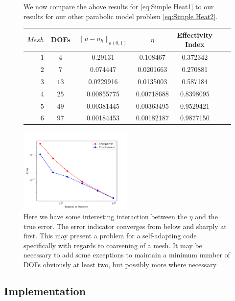 \documentclass{uonmathreport}
\theoremstyle{definition}
\theoremstyle{problem}
\theoremstyle{theorem}
\begin{document}
\begin{figure}[h]
We now compare the above results for \ref{eq:Simple Heat1} to our results for our other parabolic model problem \ref{eq:Simple Heat2}. 
\begin{center}
  \begin{tabular}{r|cccccc}  \label{table:IndicatorPDE2}
    $Mesh$   & DOFs & $\|u-u_h\|_{a(0,1)}$ & $\eta$ & Effectivity Index  \\ \hline
    $1$ & $4$ & 0.29131 &  0.108467  & 0.372342 \\
    $2$ & $7$ & 0.074447 &  0.0201663  &  0.270881\\
    $3$ & $13$ & 0.0229916 & 0.0135003  & 0.587184 \\
	$4$ & $25$ & 0.00855775 &  0.00718688  & 0.8398095 \\
    $5$ & $49$ & 0.00381445 &  0.00363495  & 0.9529421  \\
    $6$ & $97$ & 0.00184453 &  0.00182187   &  0.9877150\\
  \end{tabular}
\end{center}


\caption{Here we have some interesting interaction between the $\eta$ and the true error. The error indicator converges from below and sharply at first. This may present a problem for a self-adapting code specifically with regards to coarsening of a mesh. It may be necessary to add some exceptions to maintain a minimum number of DOFs obviously at least two, but possibly more where necessary}
   \includegraphics[width=0.5\textwidth]{IndicatorPDE2.pdf}
   
 \label{fig:IndicatorPDE2}
\end{figure}

\clearpage

\subsection{Implementation} \label{subsubsec:KK Implementation}
\end{document}
